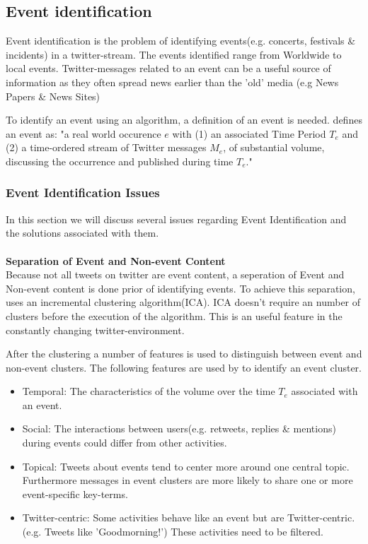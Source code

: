 \documentclass{article}
\begin{document}
\subsection{Event identification}

Event identification is the problem of identifying events(e.g. concerts, festivals \& incidents) in a twitter-stream. The events identified range from Worldwide to local events. Twitter-messages related to an event can be a useful source of information as they often spread news earlier than the 'old' media (e.g News Papers \& News Sites)

To identify an event using an algorithm, a definition of an event is needed. \cite{eventident} defines an event as: "a real world occurence $e$ with (1) an associated Time Period $T_e$ and (2) a time-ordered stream of Twitter messages $M_e$, of substantial volume, discussing the
occurrence and published during time $T_e$."

\subsubsection{Event Identification Issues}
In this section we will discuss several issues regarding Event Identification and the solutions associated with them.
\\\\ 
\textbf{Separation of Event and Non-event Content}\\
Because not all tweets on twitter are event content, a seperation of Event and Non-event content is done prior of identifying events. To achieve this separation, \cite{eventident} uses an incremental clustering algorithm(ICA). ICA doesn't require an number of clusters before the execution of the algorithm. This is an useful feature in the constantly changing twitter-environment.

After the clustering a number of features is used to distinguish between event and non-event clusters. The following features are used by \cite{eventident} to identify an event cluster. 
\begin{itemize}
  \item Temporal: The characteristics of the volume over the time $T_e$ associated with an event. 
  \item Social: The interactions between users(e.g. retweets, replies \& mentions) during events could differ from other activities. 
  \item Topical: Tweets about events tend to center more around one central topic. Furthermore messages in event clusters are more likely to share one or more event-specific key-terms.  
  \item Twitter-centric: Some activities behave like an event but are Twitter-centric.(e.g. Tweets like 'Goodmorning!') These activities need to be filtered. 
\end{itemize}
\end{document}
